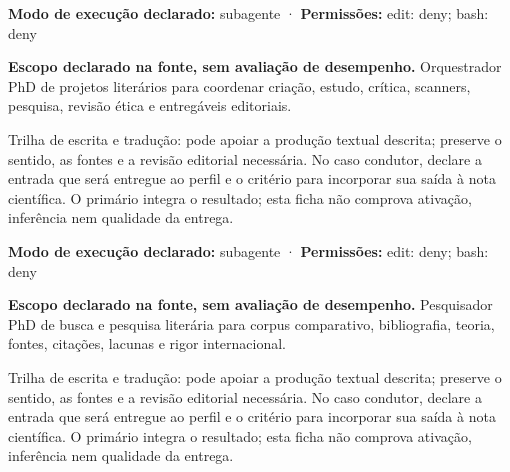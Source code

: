 \begin{arquitetura}
\textbf{Modo de execução declarado:} subagente · \textbf{Permissões:} edit: deny; bash: deny
\end{arquitetura}


\begin{descricao}
\textbf{Escopo declarado na fonte, sem avaliação de desempenho.}
Orquestrador PhD de projetos literários para coordenar criação, estudo, crítica, scanners, pesquisa, revisão ética e entregáveis editoriais.
\end{descricao}

\begin{funcao}
Trilha de escrita e tradução: pode apoiar a produção textual descrita; preserve o sentido, as fontes e a revisão editorial necessária. No caso condutor, declare a entrada que será entregue ao perfil e o critério para incorporar sua saída à nota científica. O primário integra o resultado; esta ficha não comprova ativação, inferência nem qualidade da entrega.
\end{funcao}

\begin{arquitetura}
\textbf{Modo de execução declarado:} subagente · \textbf{Permissões:} edit: deny; bash: deny
\end{arquitetura}


\begin{descricao}
\textbf{Escopo declarado na fonte, sem avaliação de desempenho.}
Pesquisador PhD de busca e pesquisa literária para corpus comparativo, bibliografia, teoria, fontes, citações, lacunas e rigor internacional.
\end{descricao}

\begin{funcao}
Trilha de escrita e tradução: pode apoiar a produção textual descrita; preserve o sentido, as fontes e a revisão editorial necessária. No caso condutor, declare a entrada que será entregue ao perfil e o critério para incorporar sua saída à nota científica. O primário integra o resultado; esta ficha não comprova ativação, inferência nem qualidade da entrega.
\end{funcao}

